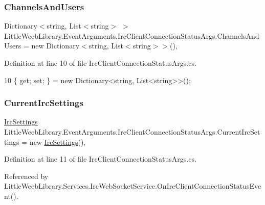 \subsubsection{\texorpdfstring{Channels\+And\+Users}{ChannelsAndUsers}}
{\footnotesize\ttfamily Dictionary$<$string, List$<$string$>$ $>$ Little\+Weeb\+Library.\+Event\+Arguments.\+Irc\+Client\+Connection\+Status\+Args.\+Channels\+And\+Users = new Dictionary$<$string, List$<$string$>$$>$()\hspace{0.3cm}{\ttfamily [get]}, {\ttfamily [set]}}



Definition at line 10 of file Irc\+Client\+Connection\+Status\+Args.\+cs.


\begin{DoxyCode}
10 \{ \textcolor{keyword}{get}; \textcolor{keyword}{set}; \} = \textcolor{keyword}{new} Dictionary<string, List<string>>();
\end{DoxyCode}
\mbox{\label{class_little_weeb_library_1_1_event_arguments_1_1_irc_client_connection_status_args_a0cdd120909dbddabaa080c5a1dabb81d}} 
\subsubsection{\texorpdfstring{Current\+Irc\+Settings}{CurrentIrcSettings}}
{\footnotesize\ttfamily \mbox{\hyperlink{class_little_weeb_library_1_1_settings_1_1_irc_settings}{Irc\+Settings}} Little\+Weeb\+Library.\+Event\+Arguments.\+Irc\+Client\+Connection\+Status\+Args.\+Current\+Irc\+Settings = new \mbox{\hyperlink{class_little_weeb_library_1_1_settings_1_1_irc_settings}{Irc\+Settings}}()\hspace{0.3cm}{\ttfamily [get]}, {\ttfamily [set]}}



Definition at line 11 of file Irc\+Client\+Connection\+Status\+Args.\+cs.



Referenced by Little\+Weeb\+Library.\+Services.\+Irc\+Web\+Socket\+Service.\+On\+Irc\+Client\+Connection\+Status\+Event().


